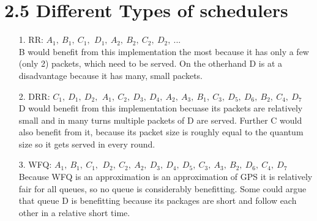 \documentclass{article}
\begin{document}
	\section*{2.5 Different Types of schedulers}
	\begin{adjustwidth}{2em}{2em}
		\begin{enumerate}
			\item[1. RR:] $A_1, \ B_1, \ C_1, \,\ D_1, \ A_2, \ B_2, \ C_2, \ D_2, \ ...$ \\
			B would benefit from this implementation the most because it has only a few (only 2) packets, which need to be served. On the otherhand D is at a disadvantage because it has many, small packets.
			\item[2. DRR:] $C_1, \ D_1, \ D_2, \,\ A_1, \ C_2, \ D_3, \ D_4, \ A_2, \ A_3, \ B_1, \ C_3, \ D_5, \ D_6, \ B_2, \ C_4, \ D_7$ \\
			D would benefit from this implementation becuase its packets are relatively small and in many turns multiple packets of D are served. Further C would also benefit from it, because its packet size is roughly equal to the quantum size so it gets served in every round.
			\item[3. WFQ:] $A_1, \ B_1, \ C_1, \,\ D_2, \ C_2, \ A_2, \ D_3, \ D_4, \ D_5, \ C_3, \ A_3, \ B_2, \ D_6, \ C_4, \ D_7$ \\
			Because WFQ is an approximation is an approximation of GPS it is relatively fair for all queues, so no queue is considerably benefitting. Some could argue that queue D is benefitting because its packages are short and follow each other in a relative short time.
		\end{enumerate}
	\end{adjustwidth}
\end{document}
